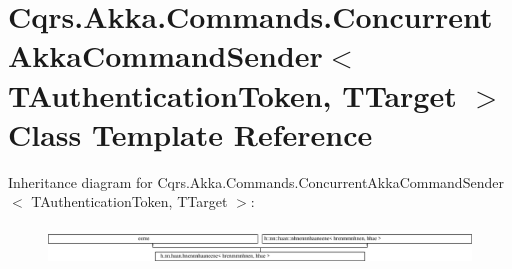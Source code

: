 \hypertarget{classCqrs_1_1Akka_1_1Commands_1_1ConcurrentAkkaCommandSender}{}\section{Cqrs.\+Akka.\+Commands.\+Concurrent\+Akka\+Command\+Sender$<$ T\+Authentication\+Token, T\+Target $>$ Class Template Reference}
\label{classCqrs_1_1Akka_1_1Commands_1_1ConcurrentAkkaCommandSender}
Inheritance diagram for Cqrs.\+Akka.\+Commands.\+Concurrent\+Akka\+Command\+Sender$<$ T\+Authentication\+Token, T\+Target $>$\+:\begin{figure}[H]
\begin{center}
\leavevmode
\includegraphics[height=1.035120cm]{classCqrs_1_1Akka_1_1Commands_1_1ConcurrentAkkaCommandSender}
\end{center}
\end{figure}
